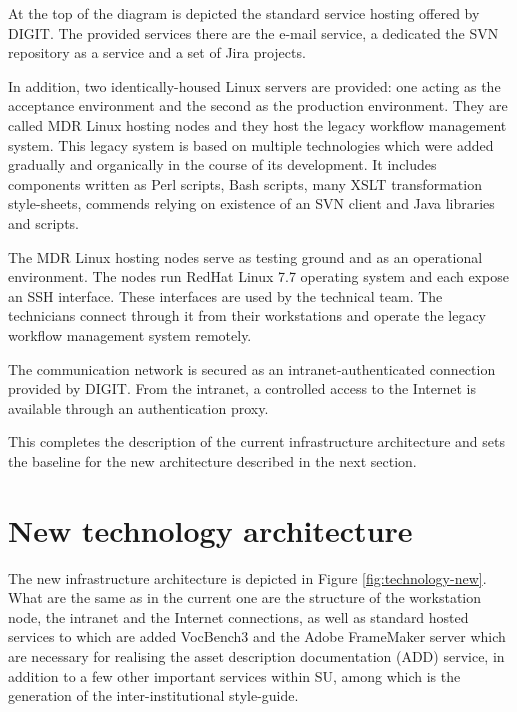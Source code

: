 	At the top of the diagram is depicted the standard service hosting offered by DIGIT. The provided services there are the e-mail service, a dedicated the SVN repository as a service and a set of Jira projects.
	
	In addition, two identically-housed Linux servers are provided: one acting as the acceptance environment and the second as the production environment. They are called MDR Linux hosting nodes and they host the legacy workflow management system. This legacy system is based on multiple technologies which were added gradually and organically in the course of its development. It includes components written as Perl scripts, Bash scripts, many XSLT transformation style-sheets, commends relying on existence of an SVN client and Java libraries and scripts.
		
	The MDR Linux hosting nodes serve as testing ground and as an operational environment. The nodes run RedHat Linux 7.7 operating system and each expose an SSH interface. These interfaces are used by the technical team. The technicians connect through it from their workstations and operate the legacy workflow management system remotely.
	
	The communication network is secured as an intranet-authenticated connection provided by DIGIT. From the intranet, a controlled access to the Internet is available through an authentication proxy. 
	
	This completes the description of the current infrastructure architecture and sets the baseline for the new architecture described in the next section.
	
	\section{New technology architecture}
	\label{sec:technology-new}
	
	The new infrastructure architecture is depicted in Figure \ref{fig:technology-new}. What are the same as in the current one are the structure of the workstation node, the intranet and the Internet connections, as well as standard hosted services to which are added VocBench3 and the Adobe FrameMaker server which are necessary for realising the asset description documentation (ADD) service, in addition to a few other important services within SU, among which is the generation of the inter-institutional style-guide. 
	
